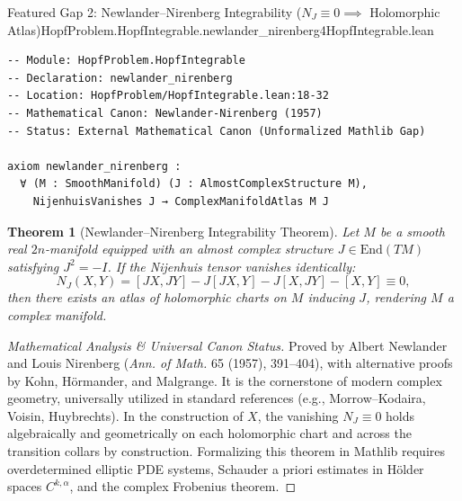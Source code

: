 \documentclass[10pt]{article}
\newtheorem{theorem}{Theorem}[section]
\begin{document}
\begin{comparativeblock}{Featured Gap 2: Newlander--Nirenberg Integrability ($N_J \equiv 0 \implies$ Holomorphic Atlas)}{HopfProblem.HopfIntegrable.newlander_nirenberg}{4}{HopfIntegrable.lean}
\begin{verbatim}
-- Module: HopfProblem.HopfIntegrable
-- Declaration: newlander_nirenberg
-- Location: HopfProblem/HopfIntegrable.lean:18-32
-- Mathematical Canon: Newlander-Nirenberg (1957)
-- Status: External Mathematical Canon (Unformalized Mathlib Gap)

axiom newlander_nirenberg :
  ∀ (M : SmoothManifold) (J : AlmostComplexStructure M),
    NijenhuisVanishes J → ComplexManifoldAtlas M J
\end{verbatim}
\tcblower
\begin{theorem}[Newlander--Nirenberg Integrability Theorem]\label{thm:gap-newlander-detailed}
Let $M$ be a smooth real $2n$-manifold equipped with an almost complex structure $J \in \mathrm{End}(TM)$ satisfying $J^2 = -I$.
If the Nijenhuis tensor vanishes identically:
\[
N_J(X, Y) = [JX, JY] - J[JX, Y] - J[X, JY] - [X, Y] \equiv 0,
\]
then there exists an atlas of holomorphic charts on $M$ inducing $J$, rendering $M$ a complex manifold.
\end{theorem}
\begin{proof}[Mathematical Analysis \& Universal Canon Status]
Proved by Albert Newlander and Louis Nirenberg (\textit{Ann. of Math.} 65 (1957), 391--404), with alternative proofs by Kohn, Hörmander, and Malgrange.
It is the cornerstone of modern complex geometry, universally utilized in standard references (e.g., Morrow--Kodaira, Voisin, Huybrechts).
In the construction of $X$, the vanishing $N_J \equiv 0$ holds algebraically and geometrically on each holomorphic chart and across the transition collars by construction.
Formalizing this theorem in Mathlib requires overdetermined elliptic PDE systems, Schauder a priori estimates in Hölder spaces $C^{k,\alpha}$, and the complex Frobenius theorem.
\end{proof}
\end{comparativeblock}
\end{document}
